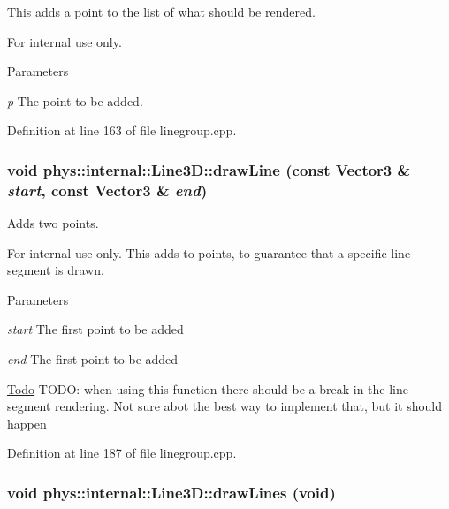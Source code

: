 This adds a point to the list of what should be rendered. 

\begin{DoxyInternal}{For internal use only.}

\begin{DoxyParams}{Parameters}
\item[{\em p}]The point to be added. \end{DoxyParams}
\end{DoxyInternal}


Definition at line 163 of file linegroup.cpp.

\hypertarget{classphys_1_1internal_1_1Line3D_a31bf19dc06547cbe042e1ddfbcf672f3}{
\subsubsection[{drawLine}]{\setlength{\rightskip}{0pt plus 5cm}void phys::internal::Line3D::drawLine (const {\bf Vector3} \& {\em start}, \/  const {\bf Vector3} \& {\em end})}}
\label{d4/db5/classphys_1_1internal_1_1Line3D_a31bf19dc06547cbe042e1ddfbcf672f3}


Adds two points. 

\begin{DoxyInternal}{For internal use only.}
This adds to points, to guarantee that a specific line segment is drawn. 
\begin{DoxyParams}{Parameters}
\item[{\em start}]The first point to be added \item[{\em end}]The first point to be added \end{DoxyParams}
\end{DoxyInternal}


\begin{Desc}
\item[\hyperlink{todo__todo000013}{Todo}]TODO: when using this function there should be a break in the line segment rendering. Not sure abot the best way to implement that, but it should happen \end{Desc}




Definition at line 187 of file linegroup.cpp.

\hypertarget{classphys_1_1internal_1_1Line3D_a008f0874c2213002e0c39330561f80f2}{
\subsubsection[{drawLines}]{\setlength{\rightskip}{0pt plus 5cm}void phys::internal::Line3D::drawLines (void)}}
\label{d4/db5/classphys_1_1internal_1_1Line3D_a008f0874c2213002e0c39330561f80f2}


